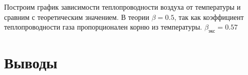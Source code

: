 \documentclass[a4paper,12pt]{article}
\begin{document}

            Построим график зависимости теплопроводности воздуха от температуры и сравним с теоретическим значением. В теории $ \beta = 0.5$, так как коэффициент теплопроводности газа пропорционален корню из температуры. $ \beta_{\text{экс}} = 0.57  $

            \begin{figure}[!ht]

                \label{k_graph}
            \end{figure}
          
            \begin{figure}[!ht]
                \label{lnk_graph}
            \end{figure}

           


            \section{Выводы}
\end{document}
